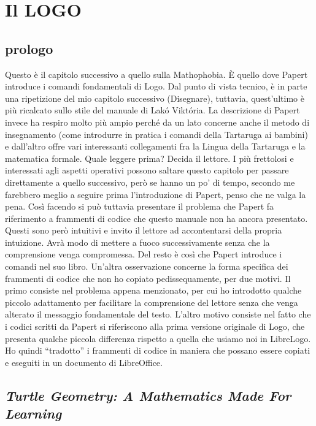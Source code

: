 \chapter{Il LOGO} \label{cap:papert2}

\section{prologo}

Questo è il capitolo successivo a quello sulla Mathophobia. È quello dove Papert introduce i comandi fondamentali di Logo. Dal punto di vista tecnico, è in parte una ripetizione del mio capitolo successivo (Disegnare), tuttavia, quest'ultimo è più ricalcato sullo stile del manuale di Lakó Viktória. La descrizione di Papert invece ha respiro molto più ampio perché da un lato concerne anche il metodo di insegnamento (come introdurre in pratica i comandi della Tartaruga ai bambini) e dall'altro offre vari interessanti collegamenti fra la Lingua della Tartaruga e la matematica formale. Quale leggere prima? Decida il lettore. I più frettolosi e interessati agli aspetti operativi possono saltare questo capitolo per passare direttamente a quello successivo, però se hanno un po' di tempo, secondo me farebbero meglio a seguire prima l'introduzione di Papert, penso che ne valga la pena. Così facendo si può tuttavia presentare il problema che Papert fa riferimento a frammenti di codice che questo manuale  non ha ancora presentato. Questi sono però intuitivi e invito il lettore ad accontentarsi della propria intuizione. Avrà modo di mettere a fuoco successivamente senza che la comprensione venga compromessa. Del resto è così che Papert introduce i comandi nel suo libro. Un'altra osservazione concerne la forma specifica dei frammenti di codice che non ho copiato pedissequamente, per due motivi. Il primo consiste nel problema appena menzionato, per cui ho introdotto qualche piccolo adattamento per facilitare la comprensione del lettore senza che venga alterato il messaggio fondamentale del testo. L'altro motivo consiste nel fatto che i codici scritti da Papert si riferiscono alla prima versione originale di Logo, che presenta qualche piccola differenza rispetto a quella che usiamo noi in LibreLogo. Ho quindi “tradotto” i frammenti di codice in maniera che possano essere copiati e eseguiti in un documento di LibreOffice.

\section{\textit{Turtle Geometry: A Mathematics Made For Learning}}

